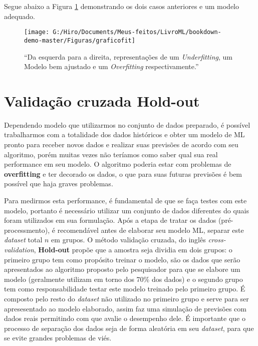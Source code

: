\documentclass[
  openany]{book}
\begin{document}
Segue abaixo a Figura \ref{fig:graficofit} demonstrando os dois casos anteriores e um modelo adequado.

\begin{figure}

{\centering \texttt{[image: G:/Hiro/Documents/Meus-feitos/LivroML/bookdown-demo-master/Figuras/graficofit]} 

}

\caption{``Da esquerda para a direita, representações de um \emph{Underfitting}, um Modelo bem ajustado e um \emph{Overfitting} respectivamente.''}\label{fig:graficofit}
\end{figure}



\hypertarget{holdout}{%
\section{Validação cruzada Hold-out}\label{holdout}}

Dependendo modelo que utilizarmos no conjunto de dados preparado, é possível trabalharmos com a totalidade dos dados históricos e obter um modelo de ML pronto para receber novos dados e realizar suas previsões de acordo com seu algoritmo, porém muitas vezes não teríamos como saber qual sua real performance em seu modelo. O algoritmo poderia estar com problemas de \textbf{overfitting} e ter decorado os dados, o que para suas futuras previsões é bem possível que haja graves problemas.

Para medirmos esta performance, é fundamental de que se faça testes com este modelo, portanto é necessário utilizar um conjunto de dados diferentes do quais foram utilizados em sua formulação. Após a etapa de tratar os dados (pré-processmento), é recomendável antes de elaborar seu modelo ML, separar este \emph{dataset} total \(n\) em grupos. O método validação cruzada, do inglês \emph{cross-validation}, \textbf{Hold-out} \citep{devroye1979distribution} propõe que a amostra seja dividia em dois grupos: o primeiro grupo tem como propósito treinar o modelo, são os dados que serão apresentados ao algoritmo proposto pelo pesquisador para que se elabore um modelo (geralmente utilizam em torno dos 70\% dos dados) e o segundo grupo tem como responsabilidade testar este modelo treinado pelo primeiro grupo. É composto pelo resto do \emph{dataset} não utilizado no primeiro grupo e serve para ser apresesentado ao modelo elaborado, assim faz uma simulação de previsões com dados reais permitindo com que avalie o desempenho dele. É importante que o processo de separação dos dados seja de forma aleatória em seu \emph{dataset}, para que se evite grandes problemas de viés.
\end{document}
